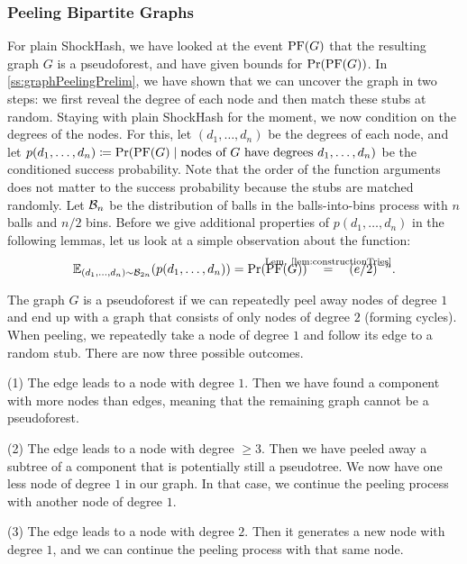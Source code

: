 \documentclass[a4paper,USenglish,cleveref]{lipics-v2021}
\def\refRelLem#1#2{\stackrel{\mathclap{\text{Lem. \ref{#1}}}}{#2}\quad}
\begin{document}
\subsubsection{Peeling Bipartite Graphs} \label{sec:peelingBipartite}
For plain ShockHash, we have looked at the event $\mathrm{PF}(G)$ that the resulting graph $G$ is a pseudoforest, and have given bounds for $\Pr(\mathrm{PF}(G))$.
In \cref{ss:graphPeelingPrelim}, we have shown that we can uncover the graph in two steps: we first reveal the degree of each node and then match these stubs at random.
Staying with plain ShockHash for the moment, we now condition on the degrees of the nodes.
For this, let $(d_1,\ldots,d_n)$ be the degrees of each node, and let $p(d_1, \ldots, d_n) \coloneqq \Pr(\mathrm{PF}(G) \mid \textrm{nodes of $G$ have degrees $d_1, \ldots, d_n$})$ be the conditioned success probability.
Note that the order of the function arguments does not matter to the success probability because the stubs are matched randomly.
Let $\mathcal{B}_n$ be the distribution of balls in the balls-into-bins process with $n$ balls and $n/2$ bins.
Before we give additional properties of $p(d_1, \ldots, d_n)$ in the following lemmas, let us look at a simple observation about the function:
\begin{align}
  \expect_{(d_1, \ldots, d_n) \sim \B_{2n}}(p(d_1, \ldots, d_n))
    = \Pr(\PF(G))
    \quad\refRelLem{lem:constructionTries}{=} (e/2)^{-n}.
  \label{obs:expectP}
\end{align}

The graph $G$ is a pseudoforest if we can repeatedly peel away nodes of degree $1$ and end up with a graph that consists of only nodes of degree $2$ (forming cycles).
When peeling, we repeatedly take a node of degree $1$ and follow its edge to a random stub.
There are now three possible outcomes.

(1) The edge leads to a node with degree $1$.
Then we have found a component with more nodes than edges, meaning that the remaining graph cannot be a pseudoforest.

(2) The edge leads to a node with degree $\geq 3$.
Then we have peeled away a subtree of a component that is potentially still a pseudotree.
We now have one less node of degree $1$ in our graph.
In that case, we continue the peeling process with another node of degree $1$.

(3) The edge leads to a node with degree $2$.
Then it generates a new node with degree $1$, and we can continue the peeling process with that same node.
\end{document}

